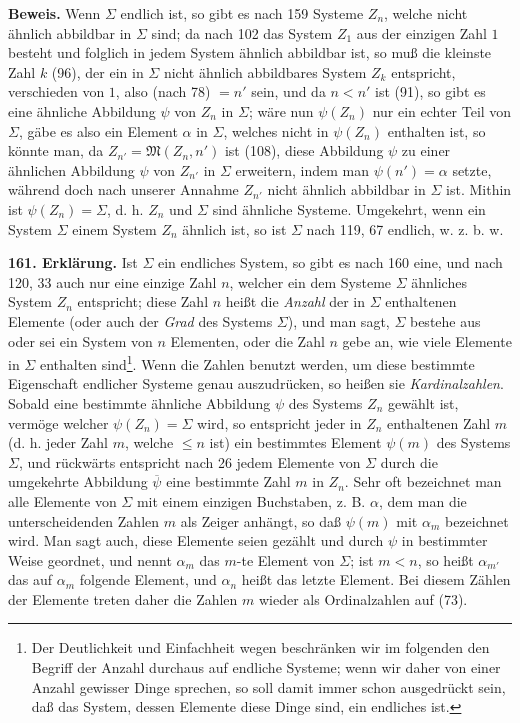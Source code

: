 \documentclass[11pt]{article}
\newcommand{\Mf}{\mathfrak{M}}
\begin{document}
\noindent\textbf{Beweis.} Wenn $\Sigma$ endlich ist, so gibt es nach 159 Systeme $Z_n$, welche nicht ähnlich abbildbar in $\Sigma$ sind; da nach 102 das System $Z_1$ aus der einzigen Zahl $1$ besteht und folglich in jedem System ähnlich abbildbar ist, so muß die kleinste Zahl $k$ (96), der ein in $\Sigma$ nicht ähnlich abbildbares System $Z_k$ entspricht, verschieden von $1$, also (nach 78) $=n'$ sein, und da $n<n'$ ist (91), so gibt es eine ähnliche Abbildung $\psi$ von $Z_n$ in $\Sigma$; wäre nun $\psi(Z_n)$ nur ein echter Teil von $\Sigma$, gäbe es also ein Element $\alpha$ in $\Sigma$, welches nicht in $\psi(Z_n)$ enthalten ist, so könnte man, da $Z_{n'}=\Mf(Z_n,n')$ ist (108), diese Abbildung $\psi$ zu einer ähnlichen Abbildung $\psi$ von $Z_{n'}$ in $\Sigma$ erweitern, indem man $\psi(n')=\alpha$ setzte, während doch nach unserer Annahme $Z_{n'}$ nicht ähnlich abbildbar in $\Sigma$ ist. Mithin ist $\psi(Z_n)=\Sigma$, d. h. $Z_n$ und $\Sigma$ sind ähnliche Systeme. Umgekehrt, wenn ein System $\Sigma$ einem System $Z_n$ ähnlich ist, so ist $\Sigma$ nach 119, 67 endlich, w. z. b. w.

\noindent\textbf{161. Erklärung.} Ist $\Sigma$ ein endliches System, so gibt es nach 160 eine, und nach 120, 33 auch nur eine einzige Zahl $n$, welcher ein dem Systeme $\Sigma$ ähnliches System $Z_n$ entspricht; diese Zahl $n$ heißt die \emph{Anzahl} der in $\Sigma$ enthaltenen Elemente (oder auch der \emph{Grad} des Systems $\Sigma$), und man sagt, $\Sigma$ bestehe aus oder sei ein System von $n$ Elementen, oder die Zahl $n$ gebe an, wie viele Elemente in $\Sigma$ enthalten sind\footnote{Der Deutlichkeit und Einfachheit wegen beschränken wir im folgenden den Begriff der Anzahl durchaus auf endliche Systeme; wenn wir daher von einer Anzahl gewisser Dinge sprechen, so soll damit immer schon ausgedrückt sein, daß das System, dessen Elemente diese Dinge sind, ein endliches ist.}. Wenn die Zahlen benutzt werden, um diese bestimmte Eigenschaft endlicher Systeme genau auszudrücken, so heißen sie \emph{Kardinalzahlen}. Sobald eine bestimmte ähnliche Abbildung $\psi$ des Systems $Z_n$ gewählt ist, vermöge welcher $\psi(Z_n)=\Sigma$ wird, so entspricht jeder in $Z_n$ enthaltenen Zahl $m$ (d. h. jeder Zahl $m$, welche $\leq n$ ist) ein bestimmtes Element $\psi(m)$ des Systems $\Sigma$, und rückwärts entspricht nach 26 jedem Elemente von $\Sigma$ durch die umgekehrte Abbildung $\overline{\psi}$ eine bestimmte Zahl $m$ in $Z_n$. Sehr oft bezeichnet man alle Elemente von $\Sigma$ mit einem einzigen Buchstaben, z. B. $\alpha$, dem man die unterscheidenden Zahlen $m$ als Zeiger anhängt, so daß $\psi(m)$ mit $\alpha_m$ bezeichnet wird. Man sagt auch, diese Elemente seien gezählt und durch $\psi$ in bestimmter Weise geordnet, und nennt $\alpha_m$ das $m$-te Element von $\Sigma$; ist $m<n$, so heißt $\alpha_{m'}$ das auf $\alpha_m$ folgende Element, und $\alpha_n$ heißt das letzte Element. Bei diesem Zählen der Elemente treten daher die Zahlen $m$ wieder als Ordinalzahlen auf (73).
\end{document}

